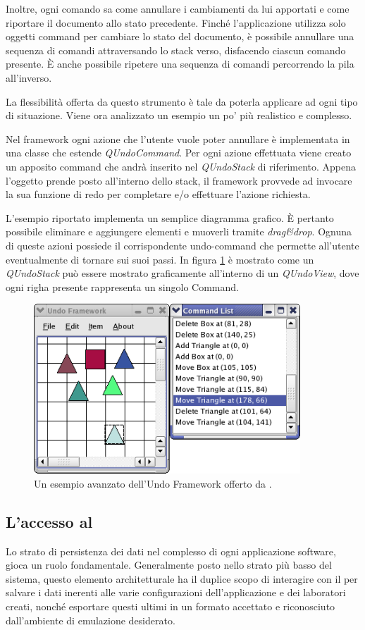 Inoltre, ogni comando sa come annullare i cambiamenti da lui apportati e come riportare il documento allo stato precedente. Finché l'applicazione utilizza solo oggetti command per cambiare lo stato del documento, è possibile annullare una sequenza di comandi attraversando lo stack verso, disfacendo ciascun comando presente. È anche possibile ripetere una sequenza di comandi percorrendo la pila all'inverso.

La flessibilità offerta da questo strumento è tale da poterla applicare ad ogni tipo di situazione. Viene ora analizzato un esempio un po' più realistico e complesso.

Nel framework ogni azione che l'utente vuole poter annullare è implementata in una classe che estende \emph{QUndoCommand}. Per ogni azione effettuata viene creato un apposito command che andrà inserito nel \emph{QUndoStack} di riferimento. Appena l'oggetto prende posto all'interno dello stack, il framework provvede ad invocare la sua funzione di redo per completare e/o effettuare l'azione richiesta.

L'esempio riportato implementa un semplice diagramma grafico. È pertanto possibile eliminare e aggiungere elementi e muoverli tramite \emph{drag\&{}drop}. Ognuna di queste azioni possiede il corrispondente undo-command che permette all'utente eventualmente di tornare sui suoi passi.
In figura \ref{figura:qt_undo} è mostrato come un \emph{QUndoStack} può essere mostrato graficamente all'interno di un \emph{QUndoView}, dove ogni righa presente rappresenta un singolo Command.

\begin{figure}[!htb]
	\centering
	\includegraphics[width=10cm]{images/undoframeworkexample.png}
	\caption{Un esempio avanzato dell'Undo Framework offerto da \qt{}.}
	\label{figura:qt_undo}
\end{figure}

\subsection{L'accesso al \fs{}}
Lo strato di persistenza dei dati nel complesso di ogni applicazione software, gioca un ruolo fondamentale. Generalmente posto nello strato più basso del sistema, questo elemento architetturale ha il duplice scopo di interagire con il \fs{} per salvare i dati inerenti alle varie configurazioni dell'applicazione e dei laboratori creati, nonché esportare questi ultimi in un formato accettato e riconosciuto dall'ambiente di emulazione desiderato.

